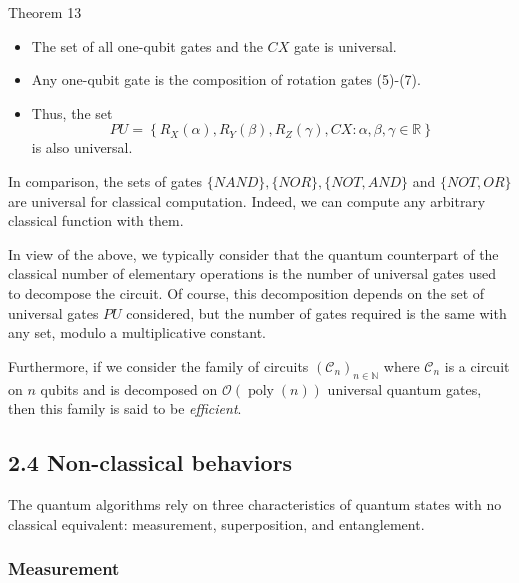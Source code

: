 \begin{theorem}
Theorem 13
\begin{itemize}
    \item The set of all one-qubit gates and the $C X$ gate is universal.
    \item Any one-qubit gate is the composition of rotation gates (5)-(7).
    \item Thus, the set 
$$
P U=\left\{R_{X}(\alpha), R_{Y}(\beta), R_{Z}(\gamma), C X: \alpha, \beta, \gamma \in \mathbb{R}\right\}
$$
is also universal.
\end{itemize}
\end{theorem}

In comparison, the sets of gates $\{N A N D\},\{N O R\},\{N O T, A N D\}$ and $\{N O T, O R\}$ are universal for classical computation.  Indeed, we can compute any arbitrary classical function with them. %

In view of the above, we typically consider that the quantum counterpart of the classical number of elementary operations is the number of universal gates used to decompose the circuit. Of course, this decomposition depends on the set of universal gates $P U$ considered, but the number of gates required is the same with any set, modulo a multiplicative constant. 


Furthermore, if we consider the family of circuits $\left(\mathcal{C}_{n}\right)_{n \in \mathbb{N}}$ where $\mathcal{C}_{n}$ is a circuit on $n$ qubits and is decomposed on $\mathcal{O}(\operatorname{poly}(n))$ universal quantum gates, then this family is said to be \textit{efficient}.

\subsection{2.4 Non-classical behaviors} %

The quantum algorithms rely on three characteristics of quantum states with no classical equivalent: measurement, superposition, and entanglement.

\subsubsection{Measurement} %

